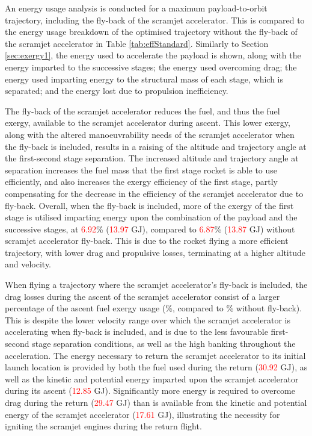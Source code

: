An energy usage analysis is conducted for a maximum payload-to-orbit trajectory, including the fly-back of the scramjet accelerator. This is compared to the energy usage breakdown of the optimised trajectory without the fly-back of the scramjet accelerator in Table \ref{tab:effStandard}. Similarly to Section \ref{sec:exergy1}, the energy used to accelerate the payload is shown, along with the energy imparted to the successive stages; the energy used overcoming drag; the energy used imparting energy to the structural mass of each stage, which is separated; and the energy lost due to propulsion inefficiency. 



The fly-back of the scramjet accelerator reduces the fuel, and thus the fuel exergy, available to the scramjet accelerator during ascent.
This lower exergy, along with the altered manoeuvrability needs of the scramjet accelerator when the fly-back is included, results in a raising of the altitude and trajectory angle at the first-second stage separation. The increased altitude and trajectory angle at separation increases the fuel mass that the first stage rocket is able to use efficiently, and also increases the exergy efficiency of the first stage, partly compensating for the decrease in the efficiency of the scramjet accelerator due to fly-back. Overall, when the fly-back is included, more of the exergy of the first stage is utilised imparting energy upon the combination of the payload and the successive stages, at \textcolor{red}{6.92}\% (\textcolor{red}{13.97} GJ), compared to \textcolor{red}{6.87}\% (\textcolor{red}{13.87} GJ) without scramjet accelerator fly-back. This is due to the rocket flying a more efficient trajectory, with lower drag and propulsive losses, terminating at a higher altitude and velocity.



When flying a trajectory where the scramjet accelerator's fly-back is included, the drag losses during the ascent of the scramjet accelerator consist of a larger percentage of the ascent fuel exergy usage  (\WDsecondStandard \%, compared to \WDsecondStandardNoReturn \% without fly-back). This is despite the lower velocity range over which the scramjet accelerator is accelerating when fly-back is included, and is due to the less favourable first-second stage separation conditions, as well as the high banking throughout the acceleration. 
The energy necessary to return the scramjet accelerator to its initial launch location is provided by both the fuel used during the return (\textcolor{red}{30.92} GJ), as well as the kinetic and potential energy imparted upon the scramjet accelerator during its ascent (\textcolor{red}{12.85} GJ). Significantly more energy is required to overcome drag during the return (\textcolor{red}{29.47} GJ) than is available from the kinetic and potential energy of the scramjet accelerator (\textcolor{red}{17.61} GJ), illustrating the necessity for igniting the scramjet engines during the return flight. 


